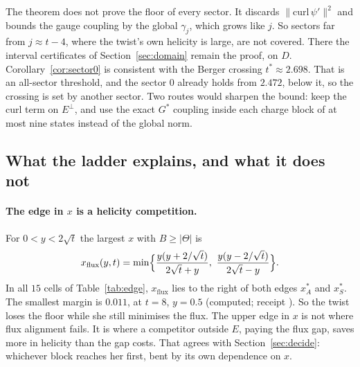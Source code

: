 \documentclass[11pt]{article}
\theoremstyle{definition}
\theoremstyle{remark}
\newcommand{\norm}[1]{\lVert #1\rVert}
\begin{document}
The theorem does not prove the floor of every sector. It discards $\norm{\mathrm{curl}\,\psi'}^2$ and bounds the gauge
coupling by the global $\gamma_j$, which grows like $j$. So sectors far from $j\approx t-4$, where the twist's own
helicity is large, are not covered. There the interval certificates of Section~\ref{sec:domain} remain the proof, on
$D$. Corollary~\ref{cor:sector0} is consistent with the Berger crossing $t^*\approx2.698$. That is an all-sector
threshold, and the sector $0$ already holds from $2.472$, below it, so the crossing is set by another sector. Two routes would sharpen the bound: keep the curl term on
$E^\perp$, and use the exact $G^*$ coupling inside each charge block of at most nine states instead of the global norm.

\subsection{What the ladder explains, and what it does not}\label{subsec:ladderreading}

\paragraph{The edge in $x$ is a helicity competition.} For $0<y<2\sqrt t$ the largest $x$ with $B\ge|\Theta|$ is
\[
  x_{\mathrm{flux}}(y,t)=\min\Bigl\{\frac{y(y+2/\sqrt t)}{2\sqrt t+y},\ \frac{y(y-2/\sqrt t)}{2\sqrt t-y}\Bigr\}.
\]
In all $15$ cells of Table~\ref{tab:edge}, $x_{\mathrm{flux}}$ lies to the right of both edges $x^*_A$ and $x^*_S$. The
smallest margin is $0.011$, at $t=8$, $y=0.5$ (computed; receipt ). So the twist loses the floor while
she still minimises the flux. The upper edge in $x$ is not where flux alignment fails. It is where a competitor
outside $E$, paying the flux gap, saves more in helicity than the gap costs. That agrees with Section~\ref{sec:decide}:
whichever block reaches her first, bent by its own dependence on $x$.
\end{document}
